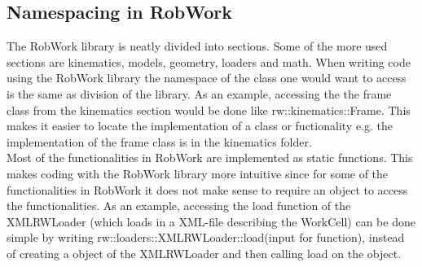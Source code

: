 \subsection{Namespacing in RobWork}
The RobWork library is neatly divided into sections. Some of the more used sections are kinematics, models, geometry, loaders and math. When writing code using the RobWork library the namespace of the class one would want to access is the same as division of the library. As an example, accessing the the frame class from the kinematics section would be done like rw::kinematics::Frame. This makes it easier to locate the implementation of a class or fuctionality e.g. the implementation of the frame class is in the kinematics folder.\\

Most of the functionalities in RobWork are implemented as static functions. This makes coding with the RobWork library more intuitive since for some of the functionalities in RobWork it does not make sense to require an object to access the functionalities. As an example, accessing the load function of the XMLRWLoader (which loads in a XML-file describing the WorkCell) can be done simple by writing rw::loaders::XMLRWLoader::load(input for function), instead of creating a object of the XMLRWLoader and then calling load on the object.


